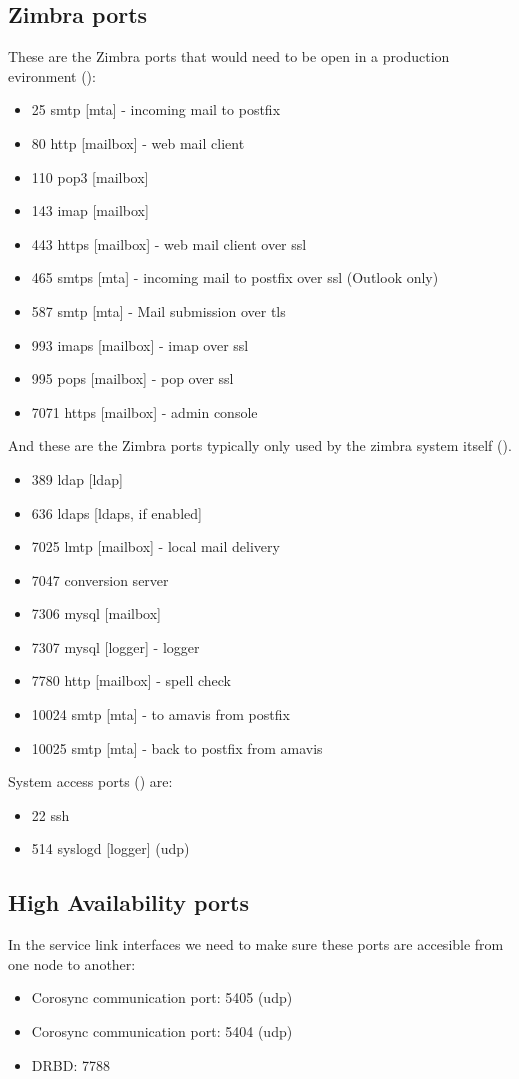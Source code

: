 \subsection {Zimbra ports}
These are the Zimbra ports that would need to be open in a production evironment (\cite{ZimbraWikiPorts}):
\begin{itemize}
  \item 25 smtp [mta] - incoming mail to postfix
  \item 80 http [mailbox] - web mail client
  \item 110 pop3 [mailbox]
  \item 143 imap [mailbox]
  \item 443 https [mailbox] - web mail client over ssl
  \item 465 smtps [mta] - incoming mail to postfix over ssl (Outlook only)
  \item 587 smtp [mta] - Mail submission over tls
  \item 993 imaps [mailbox] - imap over ssl
  \item 995 pops [mailbox] - pop over ssl
  \item 7071 https [mailbox] - admin console
\end{itemize}
And these are the Zimbra ports typically only used by the zimbra system itself (\cite{ZimbraWikiPorts}).
\begin{itemize}
  \item 389 ldap [ldap]
  \item 636 ldaps [ldaps, if enabled]
  \item 7025 lmtp [mailbox] - local mail delivery
  \item 7047 conversion server
  \item 7306 mysql [mailbox]
  \item 7307 mysql [logger] - logger
  \item 7780 http [mailbox] - spell check
  \item 10024 smtp [mta] - to amavis from postfix
  \item 10025 smtp [mta] - back to postfix from amavis
\end{itemize}
System access ports (\cite{ZimbraWikiPorts}) are:
\begin{itemize}
  \item 22 ssh
  \item 514 syslogd [logger] (udp)
\end{itemize}

\subsection {High Availability ports}
In the service link interfaces we need to make sure these ports are accesible from one node to another:
\begin{itemize}
  \item Corosync communication port: 5405 (udp)
  \item Corosync communication port: 5404 (udp)
  \item DRBD: 7788
\end{itemize}


